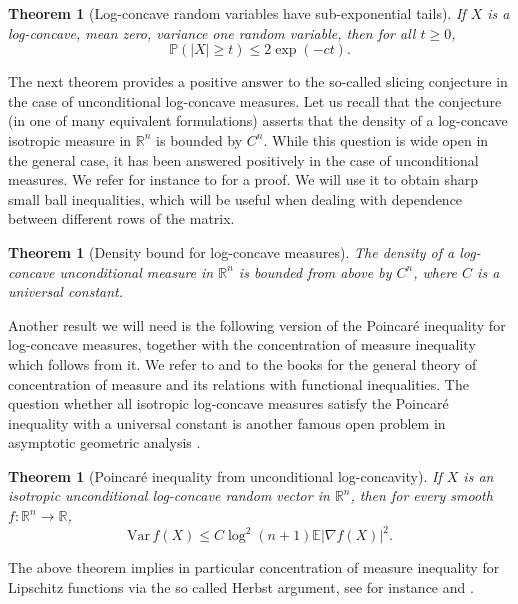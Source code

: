 \documentclass[12pt,reqno]{amsart}
\newtheorem{theorem}[lemma]{Theorem}
\begin{document}
\begin{theorem}[Log-concave random variables have sub-exponential
  tails]\label{thm:Borell} If $X$ is a log-concave, mean zero, variance
  one random variable, then for all $t \ge 0$,
  \[
  {\mathbb{P}}(|X| \ge t) \le 2\exp(-ct).
  \]
\end{theorem}

The next theorem provides a positive answer to the so-called slicing
conjecture in the case of unconditional log-concave measures. Let us recall
that the conjecture (in one of many equivalent formulations) asserts that the
density of a log-concave isotropic measure in ${\mathbb{R}}^n$ is bounded by $C^n$.
While this question is wide open in the general case, it has been answered
positively in the case of unconditional measures. We refer for instance to
\cite{BobkovNazarovUnc} for a proof. 
We will use it to obtain sharp small ball inequalities, which will be useful
when dealing with dependence between different rows of the matrix.

\begin{theorem}[Density bound for log-concave measures]\label{thm:Bourgain}
  The density of a log-concave unconditional measure in ${\mathbb{R}}^n$ is bounded from
  above by $C^n$, where $C$ is a universal constant.
\end{theorem}

Another result we will need is the following version of the Poincar\'e
inequality for log-concave measures, together with the concentration of
measure inequality which follows from it. We refer to
\cite{KlartagUnc,BartheCorderoSymmetry} and to the books
\cite{LedouxConcBook,logSob} for the general theory of concentration of
measure and its relations with functional inequalities. The question whether
all isotropic log-concave measures satisfy the Poincar\'e inequality with a
universal constant is another famous open problem in asymptotic geometric
analysis \cite{KLS}.

\begin{theorem}[Poincar\'e inequality from unconditional
  log-concavity]\label{thm:Poincare}
  If $X$ is an isotropic unconditional log-concave random vector in ${\mathbb{R}}^n$,
  then for every smooth $f\colon {\mathbb{R}}^n \to {\mathbb{R}}$,
  \[
  {\mathrm{Var}\,} f(X) \le C\log^2(n+1)  {\mathbb{E}}|\nabla f(X)|^2.
  \]
\end{theorem}

The above theorem implies in particular concentration of measure inequality
for Lipschitz functions via the so called Herbst argument, see for instance
\cite{MR708367} and \cite{LedouxConcBook}.
\end{document}

